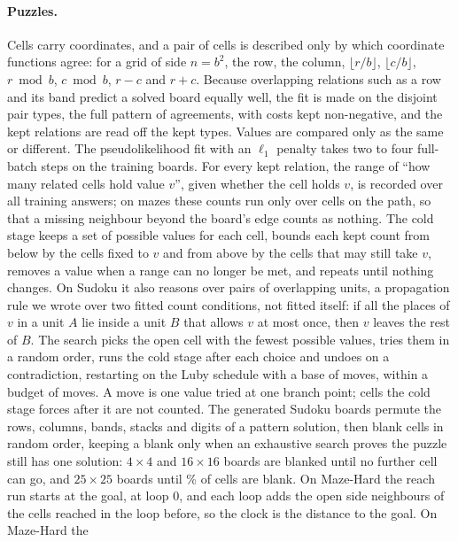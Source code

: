 \paragraph{Puzzles.} Cells carry coordinates, and a pair of cells is described only by which coordinate functions agree:
for a grid of side $n=b^2$, the row, the column, $\lfloor r/b\rfloor$, $\lfloor c/b\rfloor$, $r \bmod b$, $c \bmod b$,
$r-c$ and $r+c$. Because overlapping relations such as a row and its band predict a solved board equally well, the fit
is made on the disjoint pair types, the full pattern of agreements, with costs kept non-negative, and the kept relations
are read off the kept types. Values are compared only as the same or different. The pseudolikelihood fit with an
$\ell_1$ penalty takes two to four full-batch steps on the  training boards. For every kept
relation, the range of ``how many related cells hold value $v$'', given whether the cell holds $v$, is recorded over all
training answers; on mazes these counts run only over cells on the path, so that a missing neighbour beyond the board's
edge counts as nothing. The cold stage keeps a set of possible values for each cell, bounds each kept count from below
by the cells fixed to $v$ and from above by the cells that may still take $v$, removes a value when a range can no
longer be met, and repeats until nothing changes. On Sudoku it also reasons over pairs of overlapping units, a propagation
rule we wrote over two fitted count conditions, not fitted itself: if all the places of $v$ in a unit $A$ lie inside a
unit $B$ that allows $v$ at most once, then $v$ leaves the rest of $B$. The search picks the open cell with the fewest possible values, tries them in a random order, runs
the cold stage after each choice and undoes on a contradiction, restarting on the Luby schedule\cite{luby1993optimal}
with a base of  moves, within a budget of  moves. A move is one value tried at one branch
point; cells the cold stage forces after it are not counted. The generated Sudoku boards permute the rows, columns,
bands, stacks and digits of a pattern solution, then blank cells in random order, keeping a blank only when an exhaustive
search proves the puzzle still has one solution: $4\times4$ and $16\times16$ boards are blanked until no further cell
can go, and $25\times25$ boards until \% of cells are blank. On Maze-Hard the reach run starts at the
goal, at loop 0, and each loop adds the open side neighbours of the cells reached in the loop before, so the clock is the
distance to the goal. On Maze-Hard the
